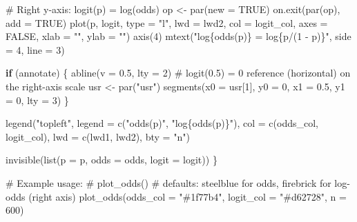 \documentclass[
  letterpaper,
]{scrbook}
\newenvironment{Shaded}{\begin{snugshade}}{\end{snugshade}}
\newcommand{\AttributeTok}[1]{\textcolor[rgb]{0.40,0.45,0.13}{#1}}
\newcommand{\CommentTok}[1]{\textcolor[rgb]{0.37,0.37,0.37}{#1}}
\newcommand{\ConstantTok}[1]{\textcolor[rgb]{0.56,0.35,0.01}{#1}}
\newcommand{\ControlFlowTok}[1]{\textcolor[rgb]{0.00,0.23,0.31}{\textbf{#1}}}
\newcommand{\DecValTok}[1]{\textcolor[rgb]{0.68,0.00,0.00}{#1}}
\newcommand{\FloatTok}[1]{\textcolor[rgb]{0.68,0.00,0.00}{#1}}
\newcommand{\FunctionTok}[1]{\textcolor[rgb]{0.28,0.35,0.67}{#1}}
\newcommand{\NormalTok}[1]{\textcolor[rgb]{0.00,0.23,0.31}{#1}}
\newcommand{\OtherTok}[1]{\textcolor[rgb]{0.00,0.23,0.31}{#1}}
\newcommand{\StringTok}[1]{\textcolor[rgb]{0.13,0.47,0.30}{#1}}
\begin{document}
\begin{Shaded}
\begin{Highlighting}[]
  \CommentTok{\# Right y{-}axis: logit(p) = log(odds)}
\NormalTok{  op }\OtherTok{\textless{}{-}} \FunctionTok{par}\NormalTok{(}\AttributeTok{new =} \ConstantTok{TRUE}\NormalTok{)}
  \FunctionTok{on.exit}\NormalTok{(}\FunctionTok{par}\NormalTok{(op), }\AttributeTok{add =} \ConstantTok{TRUE}\NormalTok{)}
  \FunctionTok{plot}\NormalTok{(p, logit, }\AttributeTok{type =} \StringTok{"l"}\NormalTok{, }\AttributeTok{lwd =}\NormalTok{ lwd2, }\AttributeTok{col =}\NormalTok{ logit\_col,}
       \AttributeTok{axes =} \ConstantTok{FALSE}\NormalTok{, }\AttributeTok{xlab =} \StringTok{""}\NormalTok{, }\AttributeTok{ylab =} \StringTok{""}\NormalTok{)}
  \FunctionTok{axis}\NormalTok{(}\DecValTok{4}\NormalTok{)}
  \FunctionTok{mtext}\NormalTok{(}\StringTok{"log\{odds(p)\} = log\{p/(1 {-} p)\}"}\NormalTok{, }\AttributeTok{side =} \DecValTok{4}\NormalTok{, }\AttributeTok{line =} \DecValTok{3}\NormalTok{)}

  \ControlFlowTok{if}\NormalTok{ (annotate) \{}
    \FunctionTok{abline}\NormalTok{(}\AttributeTok{v =} \FloatTok{0.5}\NormalTok{, }\AttributeTok{lty =} \DecValTok{2}\NormalTok{)}
    \CommentTok{\# logit(0.5) = 0 reference (horizontal) on the right{-}axis scale}
\NormalTok{    usr }\OtherTok{\textless{}{-}} \FunctionTok{par}\NormalTok{(}\StringTok{"usr"}\NormalTok{)}
    \FunctionTok{segments}\NormalTok{(}\AttributeTok{x0 =}\NormalTok{ usr[}\DecValTok{1}\NormalTok{], }\AttributeTok{y0 =} \DecValTok{0}\NormalTok{, }\AttributeTok{x1 =} \FloatTok{0.5}\NormalTok{, }\AttributeTok{y1 =} \DecValTok{0}\NormalTok{, }\AttributeTok{lty =} \DecValTok{3}\NormalTok{)}
\NormalTok{  \}}

  \FunctionTok{legend}\NormalTok{(}\StringTok{"topleft"}\NormalTok{,}
         \AttributeTok{legend =} \FunctionTok{c}\NormalTok{(}\StringTok{"odds(p)"}\NormalTok{, }\StringTok{"log\{odds(p)\}"}\NormalTok{),}
         \AttributeTok{col =} \FunctionTok{c}\NormalTok{(odds\_col, logit\_col),}
         \AttributeTok{lwd =} \FunctionTok{c}\NormalTok{(lwd1, lwd2), }\AttributeTok{bty =} \StringTok{"n"}\NormalTok{)}

  \FunctionTok{invisible}\NormalTok{(}\FunctionTok{list}\NormalTok{(}\AttributeTok{p =}\NormalTok{ p, }\AttributeTok{odds =}\NormalTok{ odds, }\AttributeTok{logit =}\NormalTok{ logit))}
\NormalTok{\}}

\CommentTok{\# Example usage:}
\CommentTok{\# plot\_odds()  \# defaults: steelblue for odds, firebrick for log{-}odds (right axis)}
\FunctionTok{plot\_odds}\NormalTok{(}\AttributeTok{odds\_col =} \StringTok{"\#1f77b4"}\NormalTok{, }\AttributeTok{logit\_col =} \StringTok{"\#d62728"}\NormalTok{, }\AttributeTok{n =} \DecValTok{600}\NormalTok{)}
\end{Highlighting}
\end{Shaded}
\end{document}
